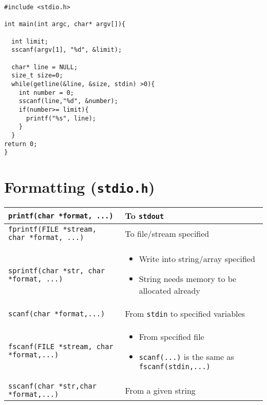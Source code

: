 \documentclass{article}
\begin{document}
\begin{verbatim}
#include <stdio.h>

int main(int argc, char* argv[]){

  int limit;
  sscanf(argv[1], "%d", &limit);

  char* line = NULL;
  size_t size=0;
  while(getline(&line, &size, stdin) >0){
    int number = 0;
    sscanf(line,"%d", &number);
    if(number>= limit){
      printf("%s", line);
    }
  }
return 0;
}
\end{verbatim}



\section{Formatting (\texttt{stdio.h})}
{\renewcommand{\arraystretch}{2}
\begin{tabularx}{\textwidth}{|X|X|}
\hline
\texttt{printf(char *format, ...)} & To \texttt{stdout}\\
\hline
\texttt{fprintf(FILE *stream, char *format, ...)}&To file/stream specified\\
\hline
\texttt{sprintf(char *str, char *format, ...)}&
\begin{itemize}
	\item Write into string/array specified 
	\item String needs memory to be allocated already
\end{itemize}\\
\hline
\texttt{scanf(char *format,...)}& From \texttt{stdin} to specified variables\\
\hline
\texttt{fscanf(FILE *stream, char *format,...)}&
\begin{itemize}
	\item From specified file 
	\item \texttt{scanf(...)} is the same as \texttt{fscanf(stdin,...)}
\end{itemize}\\
\hline
\texttt{sscanf(char *str,char *format,...)}&From a given string\\
\hline


\end{tabularx}
}
\end{document}
